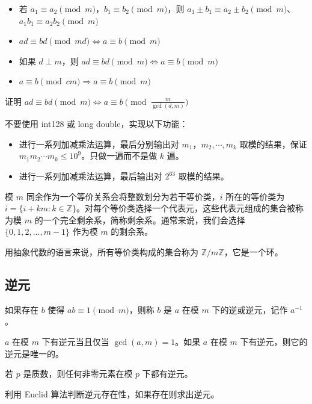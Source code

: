 \begin{property}[同余的运算性质]
    \begin{itemize}
        \item 若 $a_1\equiv a_2\pmod m$，$b_1\equiv b_2\pmod m$，则 $a_1\pm b_1\equiv a_2\pm b_2\pmod m$、$a_1b_1\equiv a_2b_2\pmod m$
        \item $ad\equiv bd\pmod{md}\Longleftrightarrow a\equiv b\pmod m$
        \item 如果 $d\perp m$，则 $ad\equiv bd\pmod m\Longleftrightarrow a\equiv b\pmod m$
        \item $a\equiv b\pmod{cm}\Longrightarrow a\equiv b\pmod m$
    \end{itemize}
\end{property}
\begin{exercise}
    证明 $ad\equiv bd\pmod m\Longleftrightarrow a\equiv b\pmod{\frac{m}{\gcd(d,m)}}$
\end{exercise}
\begin{exercise}
    不要使用 int128 或 long double，实现以下功能：
    \begin{itemize}
        \item 进行一系列加减乘法运算，最后分别输出对 $m_1$，$m_2,\cdots,m_k$ 取模的结果，保证 $m_1m_2\cdots m_k\le 10^9$。只做一遍而不是做 $k$ 遍。
        \item 进行一系列加减乘法运算，最后输出对 $2^{63}$ 取模的结果。
    \end{itemize}
\end{exercise}

模 $m$ 同余作为一个等价关系会将整数划分为若干等价类，$i$ 所在的等价类为 $\bar i=\{i+km:k\in \mathbb Z\}$。对每个等价类选择一个代表元，这些代表元组成的集合被称为模 $m$ 的一个完全剩余系，简称剩余系。通常来说，我们会选择 $\{0,1,2,\ldots,m-1\}$ 作为模 $m$ 的剩余系。
\begin{remark}
    用抽象代数的语言来说，所有等价类构成的集合称为 $\mathbb Z/m\mathbb Z$，它是一个环。
\end{remark}

\subsection{逆元}

如果存在 $b$ 使得 $ab\equiv 1\pmod m$，则称 $b$ 是 $a$ 在模 $m$ 下的逆或逆元，记作 $a^{-1}$。

\begin{theorem}
    $a$ 在模 $m$ 下有逆元当且仅当 $\gcd(a,m)=1$。如果 $a$ 在模 $m$ 下有逆元，则它的逆元是唯一的。
\end{theorem}
\begin{corollary}
    若 $p$ 是质数，则任何非零元素在模 $p$ 下都有逆元。
\end{corollary}
\begin{exercise}
    利用 Euclid 算法判断逆元存在性，如果存在则求出逆元。
\end{exercise}


